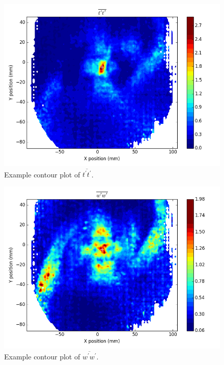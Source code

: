 {\begin{figure}[H]
	\centering
	\includegraphics[width=5in]{figs/example_vortex_figs/example_tt_contour}
\caption{Example contour plot of $\overline{t^\prime t^\prime}$.}
\label{fig:examp_tt}
\end{figure}

\begin{figure}[H]
	\centering
	\includegraphics[width=5in]{figs/example_vortex_figs/example_ww_contour}
\caption{Example contour plot of $\overline{w^\prime w^\prime}$.}
\label{fig:examp_ww}
\end{figure}

}

